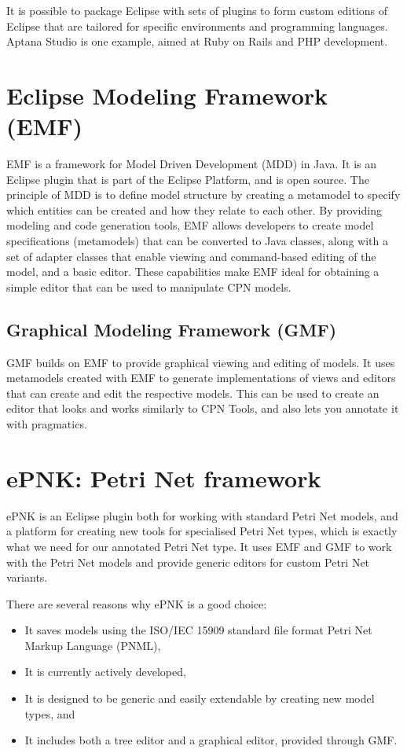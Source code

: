 It is possible to package Eclipse with sets of
plugins to form custom editions of Eclipse that are tailored for specific
environments and programming languages. Aptana Studio is one example, aimed at
Ruby on Rails and PHP development.


\section{Eclipse Modeling Framework (EMF)}
EMF is a framework for Model Driven Development (MDD) in Java. It is an Eclipse
plugin that is part of the Eclipse Platform, and is open source. The principle
of MDD is to define model structure by creating a metamodel to specify which
entities can be created and how they relate to each other. By providing modeling
and code generation tools, EMF allows developers to create model specifications
(metamodels) that can be converted to Java classes, along with a set of adapter
classes that enable viewing and command-based editing of the model, and a basic
editor. These capabilities make EMF ideal for obtaining a simple editor that can
be used to manipulate CPN models. 


	\subsection{Graphical Modeling Framework (GMF)}
	GMF builds on EMF to provide graphical viewing and editing of models. It uses
	metamodels created with EMF to generate implementations of views and editors
	that can create and edit the respective models. This can be used to create an
	editor that looks and works similarly to CPN Tools, and also lets you annotate
	it with pragmatics.

\section{ePNK: Petri Net framework}
ePNK is an Eclipse plugin both for working with standard Petri Net models, and a
platform for creating new tools for specialised Petri Net types, which is
exactly what we need for our annotated Petri Net type. It uses EMF and GMF to
work with the Petri Net models and provide generic editors for custom Petri Net variants.

There are several reasons why ePNK is a good choice:
\begin{itemize}
	\item It saves models using the ISO/IEC 15909  standard file
	format Petri Net Markup Language (PNML),
	\item It is currently actively developed,
	\item It is designed to be generic and easily extendable by creating new model
	types, and
	\item It includes both a tree editor and a graphical editor, provided through
	GMF.
\end{itemize}

